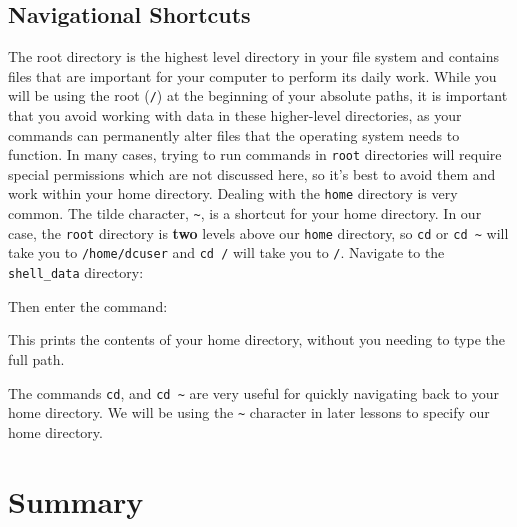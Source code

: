 \documentclass[
  letterpaper,
  DIV=11,
  numbers=noendperiod]{scrreprt}
\newenvironment{Shaded}{\begin{snugshade}}{\end{snugshade}}
\newcommand{\ExtensionTok}[1]{\textcolor[rgb]{0.00,0.23,0.31}{#1}}
\newcommand{\NormalTok}[1]{\textcolor[rgb]{0.00,0.23,0.31}{#1}}
\begin{document}
\subsection{Navigational Shortcuts}\label{navigational-shortcuts}

The root directory is the highest level directory in your file system
and contains files that are important for your computer to perform its
daily work. While you will be using the root (\texttt{/}) at the
beginning of your absolute paths, it is important that you avoid working
with data in these higher-level directories, as your commands can
permanently alter files that the operating system needs to function. In
many cases, trying to run commands in \texttt{root} directories will
require special permissions which are not discussed here, so it's best
to avoid them and work within your home directory. Dealing with the
\texttt{home} directory is very common. The tilde character,
\texttt{\textasciitilde{}}, is a shortcut for your home directory. In
our case, the \texttt{root} directory is \textbf{two} levels above our
\texttt{home} directory, so \texttt{cd} or
\texttt{cd\ \textasciitilde{}} will take you to \texttt{/home/dcuser}
and \texttt{cd\ /} will take you to \texttt{/}. Navigate to the
\texttt{shell\_data} directory:

\begin{Shaded}
\end{Shaded}

Then enter the command:

\begin{Shaded}
\end{Shaded}

This prints the contents of your home directory, without you needing to
type the full path.

The commands \texttt{cd}, and \texttt{cd\ \textasciitilde{}} are very
useful for quickly navigating back to your home directory. We will be
using the \texttt{\textasciitilde{}} character in later lessons to
specify our home directory.

\section{Summary}\label{summary-1}
\end{document}
